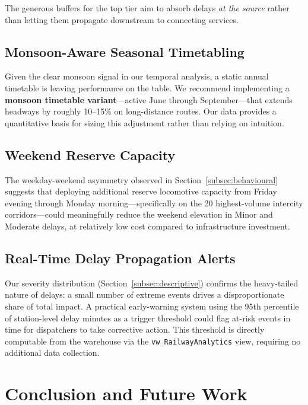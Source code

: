 \documentclass[conference]{IEEEtran}
\begin{document}
The generous buffers for the top tier aim to absorb delays
\textit{at the source} rather than letting them propagate downstream to
connecting services.

\subsection{Monsoon-Aware Seasonal Timetabling}

Given the clear monsoon signal in our temporal analysis, a static annual
timetable is leaving performance on the table.
We recommend implementing a \textbf{monsoon timetable variant}---active
June through September---that extends headways by roughly 10--15\% on
long-distance routes.
Our data provides a quantitative basis for sizing this adjustment rather
than relying on intuition.

\subsection{Weekend Reserve Capacity}

The weekday-weekend asymmetry observed in Section~\ref{subsec:behavioural}
suggests that deploying additional reserve locomotive capacity from Friday
evening through Monday morning---specifically on the 20 highest-volume
intercity corridors---could meaningfully reduce the weekend elevation in
Minor and Moderate delays, at relatively low cost compared to
infrastructure investment.

\subsection{Real-Time Delay Propagation Alerts}

Our severity distribution (Section~\ref{subsec:descriptive}) confirms the
heavy-tailed nature of delays: a small number of extreme events drives a
disproportionate share of total impact.
A practical early-warning system using the 95th percentile of
station-level delay minutes as a trigger threshold could flag at-risk events
in time for dispatchers to take corrective action.
This threshold is directly computable from the warehouse via the
\texttt{vw\_RailwayAnalytics} view, requiring no additional data collection.

\section{Conclusion and Future Work}
\label{sec:conclusion}
\end{document}
